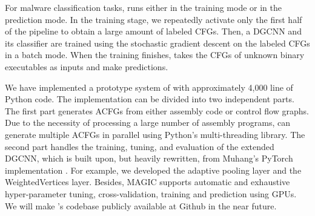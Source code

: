 For malware classification tasks, \sysname runs either in the training mode or in the prediction mode.
In the training stage, we repeatedly activate only the first half of the pipeline to obtain a large amount of labeled CFGs.
Then, a DGCNN and its classifier are trained using the stochastic gradient descent on the labeled CFGs in a batch mode.
When the training finishes, \sysname takes the CFGs of unknown binary executables as inputs and make predictions.

We have implemented a prototype system of \sysname with approximately 4,000 line of Python code.
The implementation can be divided into two independent parts.
The first part generates ACFGs from either assembly code or control flow graphs.
Due to the necessity of processing a large number of assembly programs, \sysname can generate multiple ACFGs in parallel using Python's multi-threading library.
The second part handles the training, tuning, and evaluation of the extended DGCNN, which is built upon, but heavily rewritten, from Muhang's PyTorch implementation \cite{MuhanDgcnn}.
For example, we developed the adaptive pooling layer and the WeightedVertices layer.
Besides, MAGIC supports automatic and exhaustive hyper-parameter tuning, cross-validation, training and prediction using GPUs.
We will make \sysname's codebase publicly available at Github in the near future.


